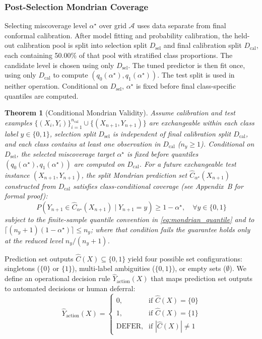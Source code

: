 \documentclass{ieeetj}
\newtheorem{theorem}{Theorem}
\begin{document}
\subsubsection{Post-Selection Mondrian Coverage}
Selecting miscoverage level $\alpha^\star$ over grid $\mathcal{A}$ uses data separate from final conformal calibration. After model fitting and probability calibration, the held-out calibration pool is split into selection split $D_{\mathrm{sel}}$ and final calibration split $D_{\mathrm{cal}}$, each containing 50.00\% of that pool with stratified class proportions. The candidate level is chosen using only $D_{\mathrm{sel}}$. The tuned predictor is then fit once, using only $D_{\mathrm{cal}}$ to compute $(q_0(\alpha^\star),q_1(\alpha^\star))$. The test split is used in neither operation. Conditional on $D_{\mathrm{sel}}$, $\alpha^\star$ is fixed before final class-specific quantiles are computed.

\begin{theorem}[Conditional Mondrian Validity]
Assume calibration and test examples $\{(X_i, Y_i)\}_{i=1}^{n_{\mathrm{cal}}} \cup \{(X_{n+1}, Y_{n+1})\}$ are exchangeable within each class label $y \in \{0, 1\}$, selection split $D_{\mathrm{sel}}$ is independent of final calibration split $D_{\mathrm{cal}}$, and each class contains at least one observation in $D_{\mathrm{cal}}$ ($n_y \ge 1$). Conditional on $D_{\mathrm{sel}}$, the selected miscoverage target $\alpha^\star$ is fixed before quantiles $(q_0(\alpha^\star), q_1(\alpha^\star))$ are computed on $D_{\mathrm{cal}}$. For a future exchangeable test instance $(X_{n+1}, Y_{n+1})$, the split Mondrian prediction set $\hat{C}_{\alpha^\star}(X_{n+1})$ constructed from $D_{\mathrm{cal}}$ satisfies class-conditional coverage (see Appendix~B for formal proof):
\begin{equation}
P(Y_{n+1} \in \hat{C}_{\alpha^\star}(X_{n+1}) \mid Y_{n+1} = y) \ge 1 - \alpha^\star, \quad \forall y \in \{0, 1\}
\end{equation}
subject to the finite-sample quantile convention in \eqref{eq:mondrian_quantile} and to $\lceil (n_y+1)(1-\alpha^\star) \rceil \le n_y$; where that condition fails the guarantee holds only at the reduced level $n_y/(n_y+1)$.
\end{theorem}

Prediction set outputs $\hat{C}(X) \subseteq \{0, 1\}$ yield four possible set configurations: singletons ($\{0\}$ or $\{1\}$), multi-label ambiguities ($\{0, 1\}$), or empty sets ($\emptyset$). We define an operational decision rule $\hat{Y}_{\mathrm{action}}(X)$ that maps prediction set outputs to automated decisions or human deferral:
\begin{equation}
\hat{Y}_{\mathrm{action}}(X) = \begin{cases} 
0, & \text{if } \hat{C}(X) = \{0\} \\
1, & \text{if } \hat{C}(X) = \{1\} \\
\text{DEFER}, & \text{if } |\hat{C}(X)| \neq 1
\end{cases}
\end{equation}
\end{document}
